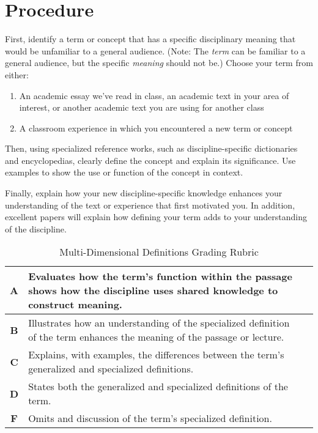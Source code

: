 \documentclass[10pt, oneside,twocolumn]{amsart}	%
\begin{document}
\section{Procedure} %
\label{sec:procedure}
First, identify a term or concept that has a specific disciplinary meaning that would be unfamiliar to a general audience. (Note: The \emph{term} can be familiar to a general audience, but the specific \emph{meaning} should not be.)  Choose your term from either:
\begin{enumerate}
	\item An academic essay we’ve read in class, an academic text in your area of interest, or another academic text you are using for another class 

\item A classroom experience in which you encountered a new term or concept
\end{enumerate}
Then, using specialized reference works, such as discipline-specific dictionaries and encyclopedias, clearly define the concept and explain its significance.  Use examples to show the use or function of the concept in context.

Finally, explain how your new discipline-specific knowledge enhances your understanding of the text or experience that first motivated you.  In addition, excellent papers will explain how defining your term adds to your understanding of the discipline.

\begin{table}[b]
	\caption{Multi-Dimensional Definitions Grading Rubric}\label{tab:rubric}
\begin{tabulary}{\columnwidth}{cJJ}
	\toprule 
\textbf{A} & 	Evaluates how the term’s function within the passage shows how the discipline uses shared knowledge to construct meaning.	\\
\midrule \textbf{B} & 	Illustrates how an understanding of the specialized definition of the term enhances the meaning of the passage or lecture.	\\
\midrule \textbf{C} &	Explains, with examples, the differences between the term’s generalized and specialized definitions.	\\
\midrule \textbf{D} &	States both the generalized and specialized definitions of the term.	\\
\midrule \textbf{F} &	Omits and discussion of the term’s specialized definition.	\\
	\bottomrule
\end{tabulary}
\end{table}
\end{document}
